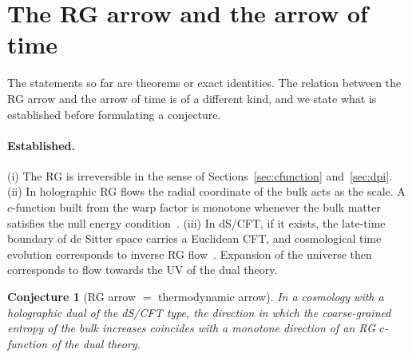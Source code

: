 \documentclass[11pt]{article}
\newtheorem{conjecture}{Conjecture}
\theoremstyle{remark}\newtheorem*{remark}{Remark}
\begin{document}
\section{The RG arrow and the arrow of time}
\label{sec:arrow}

The statements so far are theorems or exact identities. The relation between the RG arrow and the arrow of time
is of a different kind, and we state what is established before formulating a conjecture.

\paragraph{Established.}
(i) The RG is irreversible in the sense of Sections~\ref{sec:cfunction} and~\ref{sec:dpi}.
(ii) In holographic RG flows the radial coordinate of the bulk acts as the scale. A $c$-function built from the
warp factor is monotone whenever the bulk matter satisfies the null energy condition~\cite{FGPW,MyersSinha}.
(iii) In dS/CFT, if it exists, the late-time boundary of de Sitter space carries a Euclidean CFT, and cosmological
time evolution corresponds to inverse RG flow~\cite{StromingerdS,StromingerInfl}. Expansion of the universe then
corresponds to flow towards the UV of the dual theory.

\begin{conjecture}[RG arrow $=$ thermodynamic arrow]
\label{conj:arrow}
In a cosmology with a holographic dual of the dS/CFT type, the direction in which the coarse-grained entropy of the
bulk increases coincides with a monotone direction of an RG $c$-function of the dual theory.
\end{conjecture}
\end{document}
